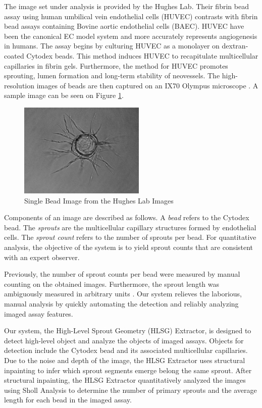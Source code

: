 \documentclass{sig-alternate}
\begin{document}
	The image set under analysis is provided by the Hughes Lab. Their
	fibrin bead assay using human umbilical vein endothelial cells (HUVEC)
	contrasts with fibrin bead assays containing Bovine aortic endothelial
	cells (BAEC). HUVEC have been the canonical EC model system and more
	accurately represents angiogenesis in humans. The assay begins by
	culturing HUVEC as a monolayer on dextran-coated Cytodex beads. This
	method induces HUVEC to recapitulate multicellular capillaries in
	fibrin gels. Furthermore, the method for HUVEC promotes sprouting,
	lumen formation and long-term stability of neovessels. The
	high-resolution images of beads are then captured on an IX70 Olympus
	microscope \cite{nakatsu03}. A sample image can be seen on Figure
	\ref{fig:monobead}.

	\begin{figure}[ht]
		\centering
		\includegraphics[width=6cm]{images/mono.jpg}
		\caption{Single Bead Image from the Hughes Lab Images}
		\label{fig:monobead}
	\end{figure}

	Components of an image are described as follows. A \emph{bead} refers
	to the Cytodex bead. The \emph{sprouts} are the multicellular
	capillary structures formed by endothelial cells. The \emph{sprout
	count} refers to the number of sprouts per bead. For quantitative
	analysis, the objective of the system is to yield sprout counts that
	are consistent with an expert observer.

	Previously, the number of sprout counts per bead were measured by
	manual counting on the obtained images. Furthermore, the sprout length
	was ambiguously measured in arbitrary units \cite{nakatsu03}. Our
	system relieves the laborious, manual analysis by quickly automating
	the detection and reliably analyzing imaged assay features.

	Our system, the High-Level Sprout Geometry (HLSG) Extractor, is
	designed to detect high-level object and analyze the objects of imaged
	assays. Objects for detection include the Cytodex bead and its
	associated multicellular capillaries. Due to the noise and depth of
	the image, the HLSG Extractor uses structural inpainting to infer
	which sprout segments emerge belong the same sprout. After structural
	inpainting, the HLSG Extractor quantitatively analyzed the images
	using Sholl Analysis to determine the number of primary sprouts and the
	average length for each bead in the imaged assay.
\end{document}
